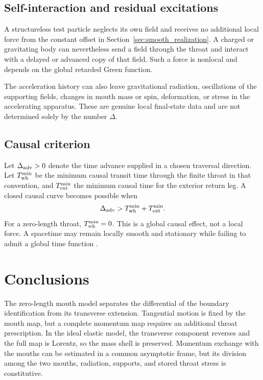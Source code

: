 \documentclass[journal,a4paper]{IEEEtran}
\begin{document}
\subsection{Self-interaction and residual excitations}

A structureless test particle neglects its own field and receives no additional local force from the constant offset in Section~\ref{sec:smooth_realization}. A charged or gravitating body can nevertheless send a field through the throat and interact with a delayed or advanced copy of that field. Such a force is nonlocal and depends on the global retarded Green function.

The acceleration history can also leave gravitational radiation, oscillations of the supporting fields, changes in mouth mass or spin, deformation, or stress in the accelerating apparatus. These are genuine local final-state data and are not determined solely by the number \(\Delta\).

\subsection{Causal criterion}

Let \(\Delta_{\rm adv}>0\) denote the time advance supplied in a chosen traversal direction. Let \(T_{\rm wh}^{\min}\) be the minimum causal transit time through the finite throat in that convention, and \(T_{\rm ext}^{\min}\) the minimum causal time for the exterior return leg. A closed causal curve becomes possible when
\begin{equation}
    \Delta_{\rm adv}
    >T_{\rm wh}^{\min}+T_{\rm ext}^{\min}.
    \label{eq:ctc_criterion}
\end{equation}
For a zero-length throat, \(T_{\rm wh}^{\min}=0\). This is a global causal effect, not a local force. A spacetime may remain locally smooth and stationary while failing to admit a global time function \cite{MorrisThorneYurtsever1988,Frolov2023}.

\section{Conclusions}
\label{sec:conclusions}

The zero-length mouth model separates the differential of the boundary identification from its transverse extension. Tangential motion is fixed by the mouth map, but a complete momentum map requires an additional throat prescription. In the ideal elastic model, the transverse component reverses and the full map is Lorentz, so the mass shell is preserved. Momentum exchange with the mouths can be estimated in a common asymptotic frame, but its division among the two mouths, radiation, supports, and stored throat stress is constitutive.
\end{document}
